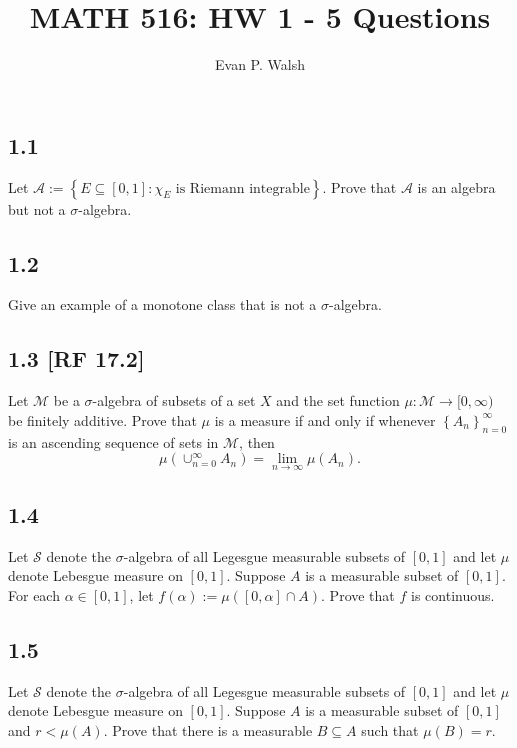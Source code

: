 \documentclass[12pt]{article}
\title{MATH 516: HW 1 - 5 Questions}
\author{Evan P. Walsh}
\begin{document}


\subsection*{1.1}
\begin{tcolorbox}
Let $\mathcal{A} := \left\{ E \subseteq [0,1] : \chi_{E} \text{ is Riemann integrable} \right\}$. Prove that $\mathcal{A}$ is an algebra but not a
$\sigma$-algebra.
\end{tcolorbox}

\subsection*{1.2}
\begin{tcolorbox}
Give an example of a monotone class that is not a $\sigma$-algebra.
\end{tcolorbox}

\subsection*{1.3 [RF 17.2]}
\begin{tcolorbox}
Let $\mathcal{M}$ be a $\sigma$-algebra of subsets of a set $X$ and the set function $\mu : \mathcal{M} \rightarrow [0, \infty)$ be finitely additive.
Prove that $\mu$ is a measure if and only if whenever $\left\{ A_{n} \right\}_{n=0}^{\infty}$ is an ascending sequence of sets in $\mathcal{M}$, then 
\[ \mu\left( \cup_{n=0}^{\infty}A_{n} \right) = \lim_{n\rightarrow\infty}\mu(A_{n}). \]
\end{tcolorbox}


\subsection*{1.4}
\begin{tcolorbox}
Let $\mathcal{S}$ denote the $\sigma$-algebra of all Legesgue measurable subsets of $[0,1]$ and let $\mu$ denote Lebesgue measure on $[0,1]$. Suppose
$A$ is a measurable subset of $[0,1]$. For each $\alpha \in [0,1]$, let $f(\alpha) := \mu([0,\alpha]\cap A)$. Prove that $f$ is continuous.
\end{tcolorbox}


\subsection*{1.5}
\begin{tcolorbox}
Let $\mathcal{S}$ denote the $\sigma$-algebra of all Legesgue measurable subsets of $[0,1]$ and let $\mu$ denote Lebesgue measure on $[0,1]$. Suppose
$A$ is a measurable subset of $[0,1]$ and $r < \mu(A)$. Prove that there is a measurable $B \subseteq A$ such that $\mu(B) = r$.
\end{tcolorbox}
\end{document}
